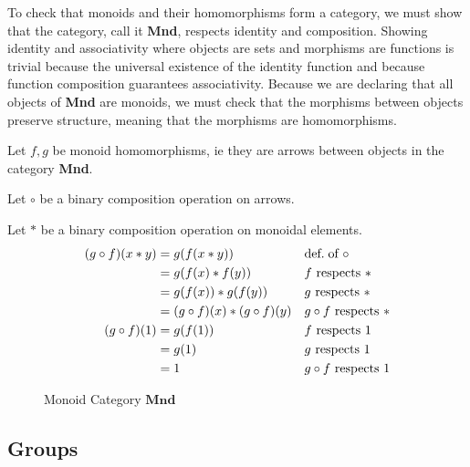 \begin{proofitem}
	\item To check that monoids and their homomorphisms form a category, we
	must show that the category, call it \textbf{Mnd}, respects identity
	and composition. Showing identity and associativity where objects are sets
	and morphisms are functions is trivial because the universal existence of
	the identity function and because function composition guarantees
	associativity. Because we are declaring that all objects of \textbf{Mnd}
	are monoids, we must check that the morphisms between objects preserve
	structure, meaning that the morphisms are homomorphisms.

	\item Let $f, g$ be monoid homomorphisms, ie they are arrows between objects in the category \textbf{Mnd}.
	\item Let $\circ$ be a binary composition operation on arrows.
	\item Let $\ast$ be a binary composition operation on monoidal elements.
	\setcounter{equation}{0}
	\begin{align*}
		(g\circ f)(x\ast y) & = g(f(x\ast y))                    &  & \text{def.\;of }\circ         \\
		                    & = g(f(x) \ast f(y))                &  & f\text{ respects }\ast        \\
		                    & = g(f(x)) \ast g(f(y))             &  & g\text{ respects }\ast        \\
		                    & = (g\circ f)(x) \ast (g\circ f)(y) &  & g\circ f\text{ respects }\ast \\
		(g\circ f)(1)       & = g(f(1))                          &  & f\text{ respects }1           \\
		                    & = g(1)                             &  & g \text{ respects }1          \\
		                    & = 1                                &  & g \circ f\text{ respects }1
	\end{align*}
\end{proofitem}
\begin{figure}[H]
	\begin{center}
		
	\end{center}
	\caption{Monoid Category $\mathbf{Mnd}$}
\end{figure}
\subsection{Groups}

